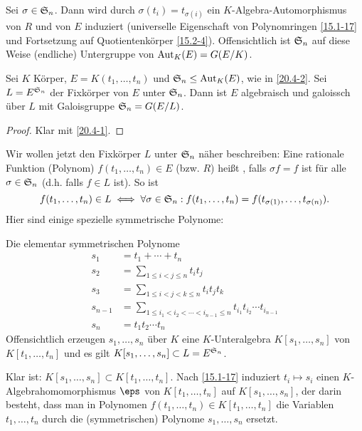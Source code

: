 \begin{df} \label{20.4-2}
	Sei $\sigma \in \S_n$.
	Dann wird durch $\sigma(t_i) = t_{\sigma(i)}$ ein $K$-Algebra-Automorphismus von $R$ und von $E$ induziert (universelle Eigenschaft von Polynomringen \ref{15.1-17} und Fortsetzung auf Quotientenkörper \ref{15.2-4}).
	Offensichtlich ist $\S_n$ auf diese Weise (endliche) Untergruppe von $\Aut_K(E) = G(E / K)$.
\end{df}

\begin{st} \label{20.4-3}
	Sei $K$ Körper, $E = K(t_1, \dotsc, t_n)$ und $\S_n \le \Aut_K(E)$, wie in \ref{20.4-2}.
	Sei $L = E^{\S_n}$ der Fixkörper von $E$ unter $\S_n$.
	Dann ist $E$ algebraisch und galoissch über $L$ mit Galoisgruppe $\S_n = G(E / L)$.
	\begin{proof}
		Klar mit \ref{20.4-1}.
	\end{proof}
\end{st}

Wir wollen jetzt den Fixkörper $L$ unter $\S_n$ näher beschreiben:
Eine rationale Funktion (Polynom) $f(t_1, \dotsc, t_n) \in E$ (bzw. $R$) heißt , falls $\sigma f = f$ ist für alle $\sigma \in \S_n$ (d.h. falls $f \in L$ ist).
So ist
\[
	f(t_1, \dotsc, t_n) \in L
	\iff
	\forall \sigma \in \S_n : f(t_1, \dotsc, t_n) = f(t_{\sigma(1)}, \dotsc, t_{\sigma(n)}).
\]
Hier sind einige spezielle symmetrische Polynome:

\begin{ex} \label{20.4-4}
	Die elementar symmetrischen Polynome
	\begin{align*}
		s_1 &= t_1 + \dotsb + t_n \\
		s_2 &= \sum_{1 \le i < j \le n} t_i t_j  \\
		s_3 &= \sum_{1 \le i < j < k \le n} t_i t_j t_k \\
		s_{n-1} &= \sum_{1 \le i_1 < i_2 < \dotsb < i_{n-1} \le n} t_{i_1} t_{i_2} \dotsb t_{i_{n-1}} \\
		s_n &= t_1 t_2 \dotsb t_n
	\end{align*}
	Offensichtlich erzeugen $s_1, \dotsc, s_n$ über $K$ eine $K$-Unteralgebra $K[s_1, \dotsc, s_n]$ von $K[t_1, \dotsc, t_n]$ und es gilt $K[s_1, \dotsc, s_n] \subset L = E^{\S_n}$.
\end{ex}

Klar ist: $K[s_1, \dotsc, s_n] \subset K[t_1, \dotsc, t_n]$.
Nach \ref{15.1-17} induziert $t_i \mapsto s_i$ einen $K$-Algebrahomomorphismus $\eps$ von $K[t_1, \dotsc, t_n]$ auf $K[s_1, \dotsc, s_n]$, der darin besteht, dass man in Polynomen $f(t_1, \dotsc, t_n) \in K[t_1, \dotsc, t_n]$ die Variablen $t_1, \dotsc, t_n$ durch die (symmetrischen) Polynome $s_1, \dotsc, s_n$ ersetzt.

